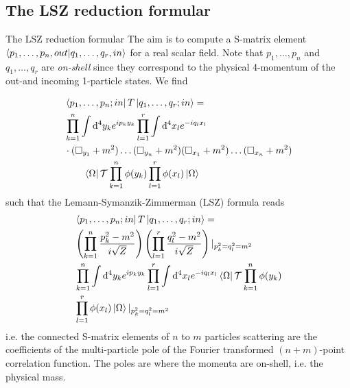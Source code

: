 \subsection{The LSZ reduction formular}
\begin{mybox}{The LSZ reduction formular}
The aim is to compute a S-matrix element $\braket{p_1,\dots,p_n,out}{q_1,\dots,q_r,in}$ for a real scalar field. Note that $p_1,\dots,p_n$ and $q_1,\dots,q_r$ are \emph{on-shell} since they correspond to the physical 4-momentum of the out-and incoming 1-particle states. We find

\begin{align}
&\bra{p_1,\dots,p_n;in}T\ket{q_1,\dots,q_r;in} = \\
&\prod_{k=1}^{n} \int \mathrm{d}^4 y_k e^{ip_k y_k} \prod_{l=1}^{r} \int \mathrm{d}^4 x_l e^{-iq_l x_l}\nonumber \\
&\cdot (\square_{y_1} +m^2) \dots (\square_{y_n} + m^2)(\square_{x_1} +m^2) \dots (\square_{x_n}+m^2)\nonumber \\
&\qquad  \bra{\Omega}\mathcal{T}\prod_{k=1}^n \phi(y_k) \prod_{l=1}^{r} \phi(x_l) \ket{\Omega}\nonumber
\end{align}
such that the Lemann-Symanzik-Zimmerman (LSZ) formula reads
\begin{align}
	\label{eq:lszformula}
	&\bra{p_1,\dots,p_n;in}T\ket{q_1,\dots,q_r;in} =\\
	& \left(\prod_{k=1}^{n} \frac{p^2_k-m^2}{i\sqrt{Z}} \right) \left(\prod_{l=1}^{r} \frac{q^2_l-m^2}{i\sqrt{Z}}\right)|_{p^2_k=q^2_l=m^2}\nonumber \\
	&\prod_{k=1 }^{n} \int\mathrm{d}^4 y_k e^{ip_k y_k} \prod_{l=1}^{r} \int \mathrm{d}^4 x_l e^{-i q_l x_l}\bra{\Omega} \mathcal{T}\prod_{k=1}^{n}\phi(y_k) \nonumber \\
	&\prod_{l=1}^{r} \phi(x_l) \ket{\Omega}|_{p^2_k=q^2_l=m^2}\nonumber
\end{align}
i.e. the connected S-matrix elements of $n$ to $m$ particles scattering are the coefficients of the multi-particle pole of the Fourier transformed $(n+m)$-point correlation function. The poles are where  the momenta are on-shell, i.e. the physical mass.
\end{mybox}
